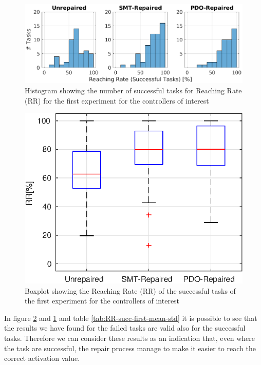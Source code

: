 \begin{figure}[H]
    \centering
    \includegraphics[width=\textwidth]{Images/first-experiment/exp0_RR_succ_hist.eps}
    \caption{Histogram showing the number of successful tasks for Reaching Rate (RR) for the first experiment for the controllers of interest}
    \label{fig:hist-RR-succ-first}
\end{figure}
\begin{figure}[H]
    \centering
    \includegraphics[width=\textwidth]{Images/first-experiment/exp0_RR_succ_box.eps}
    \caption{Boxplot showing the Reaching Rate (RR) of the successful tasks of the first experiment for the controllers of interest}
    \label{fig:box-RR-succ-first}
\end{figure}
In figure \ref{fig:box-RR-succ-first} and \ref{fig:hist-RR-succ-first} and table \ref{tab:RR-succ-first-mean-std} it is possible to see that the results we have found for the failed tasks are valid also for the successful tasks. Therefore we can consider these results as an indication that, even where the task are successful, the repair process manage to make it easier to reach the correct activation value.\\
